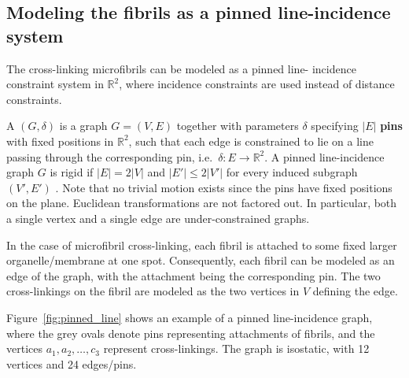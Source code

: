 \subsection{Modeling the fibrils as a pinned line-incidence system}



The cross-linking microfibrils can be modeled as a pinned line-
incidence constraint system in $\mathbb{R}^2$, where incidence
constraints are used instead of distance constraints.

A  $(G,\delta)$ is a graph $G=(V,E)$
together with parameters $\delta$ specifying $|E|$ \textbf{pins} with
fixed positions in $\mathbb{R}^2$, such that each edge is constrained
to lie on a line passing through the corresponding pin, i.e.\ $\delta:
E \rightarrow \mathbb{R}^2$.
%
%
A pinned line-incidence graph $G$ is rigid if $|E| = 2|V|$ and $|E'| \le 2|V'|$ for every induced subgraph $(V',E')$ \cite{sitharam2014incidence}. Note that no trivial motion exists since the pins have fixed positions on the plane.
Euclidean transformations are not factored out.
In particular, both a single vertex and a single edge are under-constrained graphs.




In the case of microfibril cross-linking, each fibril is
attached to some fixed larger organelle/membrane at one spot.
Consequently, each fibril can be modeled as an edge of the graph,
with the attachment being the corresponding pin.
The two cross-linkings on the fibril are modeled as the two vertices in $V$ defining the edge.



Figure~\ref{fig:pinned_line} shows an example of a pinned line-incidence graph,
where the grey ovals denote pins representing attachments of fibrils,
and the vertices $a_1,a_2,\ldots, c_3$ represent cross-linkings.
The graph is isostatic, with 12 vertices and 24 edges/pins.

